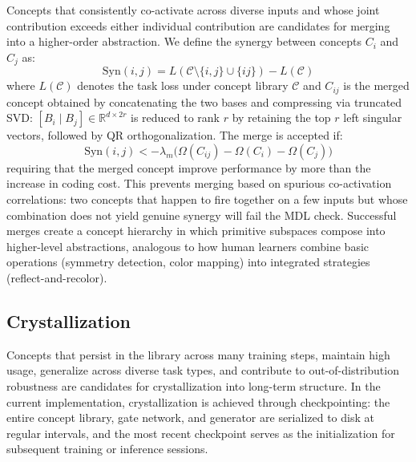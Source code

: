 \documentclass[11pt]{article}
\begin{document}
Concepts that consistently co-activate across diverse inputs and whose joint contribution exceeds either individual contribution are candidates for merging into a higher-order abstraction. We define the synergy between concepts $C_i$ and $C_j$ as:
\begin{equation}
\text{Syn}(i, j) = L(\mathcal{C} \setminus \{i, j\} \cup \{ij\}) - L(\mathcal{C})
\label{eq:synergy}
\end{equation}
where $L(\mathcal{C})$ denotes the task loss under concept library $\mathcal{C}$ and $C_{ij}$ is the merged concept obtained by concatenating the two bases and compressing via truncated SVD: $[B_i \mid B_j] \in \mathbb{R}^{d \times 2r}$ is reduced to rank $r$ by retaining the top $r$ left singular vectors, followed by QR orthogonalization. The merge is accepted if:
\begin{equation}
\text{Syn}(i, j) < -\lambda_m \big(\Omega(C_{ij}) - \Omega(C_i) - \Omega(C_j)\big)
\label{eq:merge_crit}
\end{equation}
requiring that the merged concept improve performance by more than the increase in coding cost. This prevents merging based on spurious co-activation correlations: two concepts that happen to fire together on a few inputs but whose combination does not yield genuine synergy will fail the MDL check. Successful merges create a concept hierarchy in which primitive subspaces compose into higher-level abstractions, analogous to how human learners combine basic operations (symmetry detection, color mapping) into integrated strategies (reflect-and-recolor).

\subsection{Crystallization}

Concepts that persist in the library across many training steps, maintain high usage, generalize across diverse task types, and contribute to out-of-distribution robustness are candidates for crystallization into long-term structure. In the current implementation, crystallization is achieved through checkpointing: the entire concept library, gate network, and generator are serialized to disk at regular intervals, and the most recent checkpoint serves as the initialization for subsequent training or inference sessions.
\end{document}
